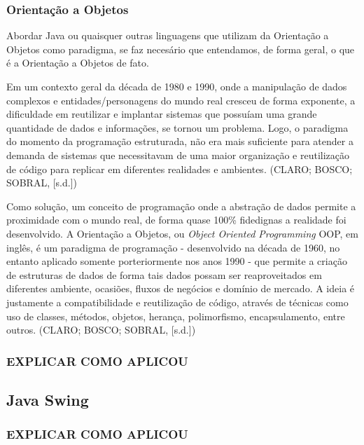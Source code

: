 \documentclass[a4paper,12pt]{article}
\begin{document}
\subsubsection{Orientação a Objetos}
Abordar Java ou quaisquer outras linguagens que utilizam da Orientação a Objetos como paradigma, se faz necesário que entendamos, de forma geral,
o que é a Orientação a Objetos de fato.

Em um contexto geral da década de 1980 e 1990, onde a manipulação de dados complexos e entidades/personagens do mundo real cresceu de forma exponente,
a dificuldade em reutilizar e implantar sistemas que possuíam uma grande quantidade de dados e informações, se tornou um problema. Logo, o paradigma do momento 
da programação estruturada, não era mais suficiente para atender a demanda de sistemas que necessitavam de uma maior organização e reutilização de código 
para replicar em diferentes realidades e ambientes. (CLARO; BOSCO; SOBRAL, [s.d.])

Como solução, um conceito de programação onde a abstração de dados permite a proximidade com o mundo real, de forma quase 100\% fidedignas a realidade foi desenvolvido.
A Orientação a Objetos, ou \textit{Object Oriented Programming} OOP, em inglês, é um paradigma de programação - desenvolvido na década de 1960, no entanto aplicado somente
porteriormente nos anos 1990 - que permite a criação de estruturas de dados de forma tais dados possam ser reaproveitados em diferentes 
ambiente, ocasiões, fluxos de negócios e domínio de mercado. A ideia é justamente a compatibilidade e reutilização de código,
através de técnicas como uso de classes, métodos, objetos, herança, polimorfismo, encapsulamento, entre outros. (CLARO; BOSCO; SOBRAL, [s.d.])

\subsubsection{EXPLICAR COMO APLICOU}

\subsection{Java Swing}

\subsubsection{EXPLICAR COMO APLICOU}
\end{document}
